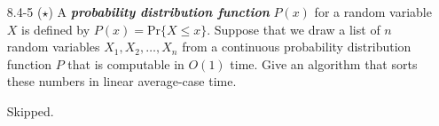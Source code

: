 \documentclass{report}
\makeatletter
\renewenvironment{framed}{%
 \def\FrameCommand##1{\hskip\@totalleftmargin
 \fboxsep=\FrameSep\fbox{##1}}%
 \MakeFramed {\advance\hsize-\width
   \@totalleftmargin\z@ \linewidth\hsize
   \@setminipage}}%
 {\par\unskip\endMakeFramed}
\makeatother
\begin{document}
\begin{enumerate}
\begin{framed}
\end{framed}

\item[8.4-5]{($\star$) A \textbf{\emph{probability distribution function}}
$P(x)$ for a random variable $X$ is defined by $P(x) = \text{Pr}\{X \le x\}$.
Suppose that we draw a list of $n$ random variables $X_1, X_2, \dots, X_n$ from
a continuous probability distribution function $P$ that is computable in $O(1)$
time. Give an algorithm that sorts these numbers in linear average-case time.}

\begin{framed}
Skipped.
\end{framed}

\end{enumerate}
\end{document}
